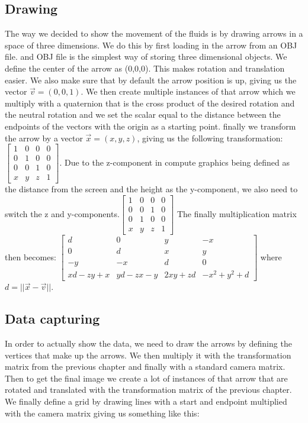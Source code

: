 \documentclass{article}
\begin{document}
\subsection{Drawing}
The way we decided to show the movement of the fluids is by drawing arrows in a space of three dimensions. We do this by first loading in the arrow from an OBJ file. and OBJ file is the simplest way of storing three dimensional objects. We define the center of the arrow as (0,0,0). This makes rotation and translation easier. We also make sure that by default the arrow position is up, giving us the vector $\vec{v}=(0,0,1)$. We then create multiple instances of that arrow which we multiply with a quaternion that is the cross product of the desired rotation and the neutral rotation and we set the scalar equal to the distance between the endpoints of the vectors with the origin as a starting point. finally we transform the arrow by a vector $\vec{x}=(x,y,z)$, giving us the following transformation: 
$\begin{bmatrix}
1 & 0 & 0 & 0\\
0 & 1 & 0 & 0\\
0 & 0 & 1 & 0\\
x & y & z & 1
\end{bmatrix}$. Due to the z-component in compute graphics being defined as the distance from the screen and the height as the y-component, we also need to switch the z and y-components.$\begin{bmatrix}
1 & 0 & 0 & 0\\
0 & 0 & 1 & 0\\
0 & 1 & 0 & 0\\
x & y & z & 1
\end{bmatrix}$
The finally multiplication matrix then becomes: 
$\begin{bmatrix}

d & 0 & y & -x\\
0 & d & x & y\\
-y & -x & d & 0\\
xd-zy+x & yd -zx - y & 2xy + zd & -x^2 + y^2 + d 

\end{bmatrix}$
where $d = ||\vec{x}-\vec{v}||$.\cite{Quaternion rotation}
\subsection{Data capturing}
In order to actually show the data, we need to draw the arrows by defining the vertices that make up the arrows. We then multiply it with the transformation matrix from the previous chapter and finally with a standard camera matrix. \cite{mvp} Then to get the final image we create a lot of instances of that arrow that are rotated and translated with the transformation matrix of the previous chapter. \label{Drawing} We finally define a grid by drawing lines with a start and endpoint multiplied with the camera matrix giving us something like this:
\end{document}
